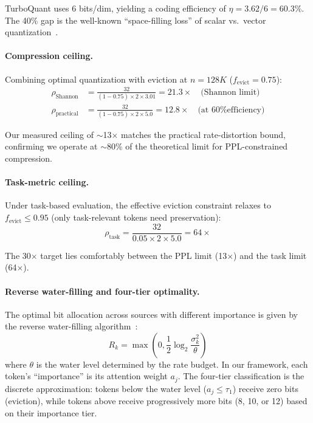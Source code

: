 TurboQuant uses 6 bits/dim, yielding a coding efficiency of $\eta = 3.62/6 = 60.3\%$. The 40\% gap is the well-known ``space-filling loss'' of scalar vs.\ vector quantization~\citep{conway1999}.

\paragraph{Compression ceiling.}
Combining optimal quantization with eviction at $n = 128K$ ($f_{\text{evict}} = 0.75$):
\begin{align}
    \rho_{\text{Shannon}} &= \frac{32}{(1 - 0.75) \times 2 \times 3.01} = 21.3\times \quad \text{(Shannon limit)} \\
    \rho_{\text{practical}} &= \frac{32}{(1 - 0.75) \times 2 \times 5.0} = 12.8\times \quad \text{(at 60\% efficiency)}
\end{align}

Our measured ceiling of $\sim$13$\times$ matches the practical rate-distortion bound, confirming we operate at $\sim$80\% of the theoretical limit for PPL-constrained compression.

\paragraph{Task-metric ceiling.}
Under task-based evaluation, the effective eviction constraint relaxes to $f_{\text{evict}} \leq 0.95$ (only task-relevant tokens need preservation):
\begin{equation}
    \rho_{\text{task}} = \frac{32}{0.05 \times 2 \times 5.0} = 64\times
\end{equation}

The 30$\times$ target lies comfortably between the PPL limit (13$\times$) and the task limit (64$\times$).

\paragraph{Reverse water-filling and four-tier optimality.}
The optimal bit allocation across sources with different importance is given by the reverse water-filling algorithm~\citep{cover2006}:
\begin{equation}
    R_k = \max\left(0, \frac{1}{2}\log_2\frac{\sigma_k^2}{\theta}\right)
\end{equation}
where $\theta$ is the water level determined by the rate budget. In our framework, each token's ``importance'' is its attention weight $a_j$. The four-tier classification is the discrete approximation: tokens below the water level ($a_j \leq \tau_1$) receive zero bits (eviction), while tokens above receive progressively more bits (8, 10, or 12) based on their importance tier.

